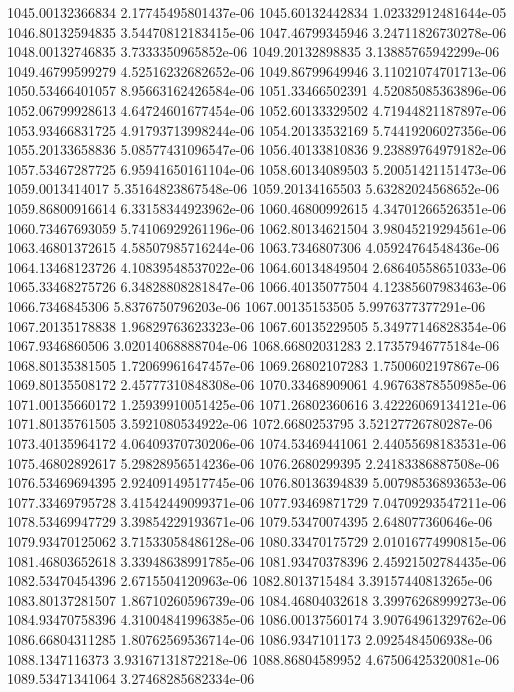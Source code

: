 {1045.00132366834 2.17745495801437e-06
1045.60132442834 1.02332912481644e-05
1046.80132594835 3.54470812183415e-06
1047.46799345946 3.24711826730278e-06
1048.00132746835 3.7333350965852e-06
1049.20132898835 3.13885765942299e-06
1049.46799599279 4.52516232682652e-06
1049.86799649946 3.11021074701713e-06
1050.53466401057 8.95663162426584e-06
1051.33466502391 4.52085085363896e-06
1052.06799928613 4.64724601677454e-06
1052.60133329502 4.71944821187897e-06
1053.93466831725 4.91793713998244e-06
1054.20133532169 5.74419206027356e-06
1055.20133658836 5.08577431096547e-06
1056.40133810836 9.23889764979182e-06
1057.53467287725 6.95941650161104e-06
1058.60134089503 5.20051421151473e-06
1059.0013414017 5.35164823867548e-06
1059.20134165503 5.63282024568652e-06
1059.86800916614 6.33158344923962e-06
1060.46800992615 4.34701266526351e-06
1060.73467693059 5.74106929261196e-06
1062.80134621504 3.98045219294561e-06
1063.46801372615 4.58507985716244e-06
1063.7346807306 4.05924764548436e-06
1064.13468123726 4.10839548537022e-06
1064.60134849504 2.68640558651033e-06
1065.33468275726 6.34828808281847e-06
1066.40135077504 4.12385607983463e-06
1066.7346845306 5.8376750796203e-06
1067.00135153505 5.9976377377291e-06
1067.20135178838 1.96829763623323e-06
1067.60135229505 5.34977146828354e-06
1067.9346860506 3.02014068888704e-06
1068.66802031283 2.17357946775184e-06
1068.80135381505 1.72069961647457e-06
1069.26802107283 1.7500602197867e-06
1069.80135508172 2.45777310848308e-06
1070.33468909061 4.96763878550985e-06
1071.00135660172 1.25939910051425e-06
1071.26802360616 3.42226069134121e-06
1071.80135761505 3.5921080534922e-06
1072.6680253795 3.52127726780287e-06
1073.40135964172 4.06409370730206e-06
1074.53469441061 2.44055698183531e-06
1075.46802892617 5.29828956514236e-06
1076.2680299395 2.24183386887508e-06
1076.53469694395 2.92409149517745e-06
1076.80136394839 5.00798536893653e-06
1077.33469795728 3.41542449099371e-06
1077.93469871729 7.04709293547211e-06
1078.53469947729 3.39854229193671e-06
1079.53470074395 2.648077360646e-06
1079.93470125062 3.71533058486128e-06
1080.33470175729 2.01016774990815e-06
1081.46803652618 3.33948638991785e-06
1081.93470378396 2.45921502784435e-06
1082.53470454396 2.6715504120963e-06
1082.8013715484 3.39157440813265e-06
1083.80137281507 1.86710260596739e-06
1084.46804032618 3.39976268999273e-06
1084.93470758396 4.31004841996385e-06
1086.00137560174 3.90764961329762e-06
1086.66804311285 1.80762569536714e-06
1086.9347101173 2.0925484506938e-06
1088.1347116373 3.93167131872218e-06
1088.86804589952 4.67506425320081e-06
1089.53471341064 3.27468285682334e-06
}
